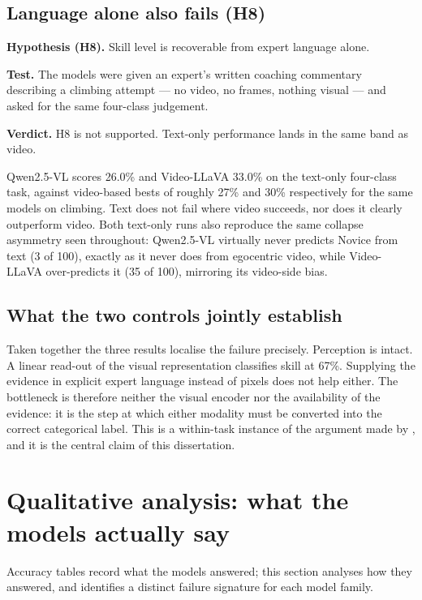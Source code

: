 \documentclass[logo,msc]{infthesis}
\newcommand{\runin}[1]{\par\medskip\noindent\textbf{#1}}
\begin{document}
\subsection{Language alone also fails (H8)}

\runin{Hypothesis (H8).} Skill level is recoverable from expert
language alone.

\runin{Test.} The models were given an expert's written coaching
commentary describing a climbing attempt --- no video, no frames, nothing
visual --- and asked for the same four-class judgement.

\runin{Verdict.} H8 is not supported. Text-only performance lands in
the same band as video.

Qwen2.5-VL scores 26.0\% and Video-LLaVA 33.0\% on the text-only
four-class task, against video-based bests of roughly 27\% and 30\%
respectively for the same models on climbing. Text does not fail where
video succeeds, nor does it clearly outperform video. Both text-only runs
also reproduce the same collapse asymmetry seen throughout: Qwen2.5-VL
virtually never predicts Novice from text (3 of 100), exactly as it never
does from egocentric video, while Video-LLaVA over-predicts it (35 of 100),
mirroring its video-side bias.

\subsection{What the two controls jointly establish}

Taken together the three results localise the failure precisely. Perception
is intact. A linear read-out of the visual representation classifies skill
at 67\%. Supplying the evidence in explicit expert language instead of
pixels does not help either. The bottleneck is therefore neither the
visual encoder nor the availability of the evidence: it is the step at
which either modality must be converted into the correct categorical label.
This is a within-task instance of the argument made by \citet{tong2024},
and it is the central claim of this dissertation.

\section{Qualitative analysis: what the models actually say}

Accuracy tables record what the models answered; this section analyses how
they answered, and identifies a distinct failure signature for each model
family.
\end{document}
